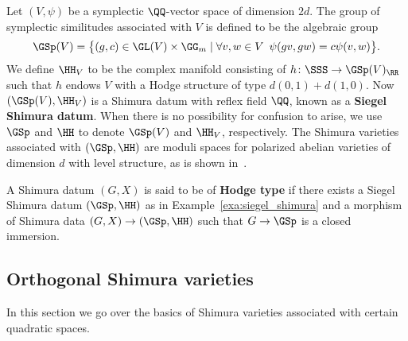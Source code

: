 \begin{example}\label{exa:siegel_shimura}
Let $(V,\psi)$ be a symplectic $\QQ$-vector space of dimension $2d$. The group of symplectic similitudes associated with $V$ is defined to be the algebraic group
$$
\GSp(V) = \big\{ (g, c) \in \GL(V) \times \GG_m \mid \forall v, w \in V\, \ \psi(gv,gw) = c \psi(v,w)\big\}.
$$
    We define $\HH_V$ to be the complex manifold consisting of $h\colon \SSS \rightarrow \GSp(V)_{\RR}$ such that $h$ endows $V$ with a Hodge structure of type $d(0,1) + d(1,0)$. Now $(\GSp(V),\HH_V)$ is a Shimura datum with reflex field $\QQ$, known as a {\bfseries Siegel Shimura datum}. When there is no possibility for confusion to arise, we use $\GSp$ and $\HH$ to denote $\GSp(V)$ and $\HH_V$, respectively. The Shimura varieties associated with $(\GSp,\HH)$ are moduli spaces for polarized abelian varieties of dimension $d$ with level structure, as is shown in~\cite[\S~4]{DeligneShimura}.
\end{example}

\begin{definition}
A Shimura datum $(G,X)$ is said to be of {\bfseries Hodge type} if there exists a Siegel Shimura datum $(\GSp,\HH)$ as in Example~\ref{exa:siegel_shimura} and a morphism of Shimura data $(G,X) \rightarrow (\GSp,\HH)$ such that $G \rightarrow \GSp$ is a closed immersion.
\end{definition}





\subsection{Orthogonal Shimura varieties}\label{sec:orthogonal_shimura_varieties}
In this section we go over the basics of Shimura varieties associated with certain quadratic spaces. 

